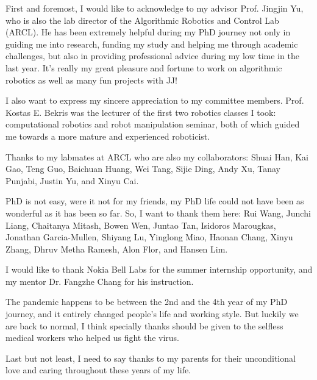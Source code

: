
\begin{acknowledgments}
First and foremost, I would like to acknowledge to my advisor Prof. Jingjin Yu, 
who is also the lab director of the Algorithmic Robotics and Control Lab (ARCL). 
He has been extremely helpful during my PhD journey 
not only in guiding me into research, funding my study and helping me through academic challenges, 
but also in providing professional advice during my low time in the last year. 
It's really my great pleasure and fortune to work on algorithmic robotics 
as well as many fun projects with JJ! 

I also want to express my sincere appreciation to my committee members. 
Prof. Kostas E. Bekris was the lecturer of the first two robotics classes I took: 
computational robotics and robot manipulation seminar, both of which guided me 
towards a more mature and experienced roboticist. 

Thanks to my labmates at ARCL who are also my collaborators: Shuai Han, 
Kai Gao, Teng Guo, Baichuan Huang, Wei Tang, Sijie Ding, Andy Xu, Tanay Punjabi, 
Justin Yu, and Xinyu Cai. 

PhD is not easy, were it not for my friends, my PhD life 
could not have been as wonderful as it has been so far. 
So, I want to thank them here: Rui Wang, Junchi Liang, Chaitanya Mitash, Bowen Wen, Juntao Tan, 
Isidoros Marougkas, Jonathan Garcia-Mullen, Shiyang Lu, Yinglong Miao, Haonan Chang, Xinyu Zhang, 
Dhruv Metha Ramesh, Alon Flor, and Hansen Lim. 

I would like to thank Nokia Bell Labs for the summer internship opportunity,
and my mentor Dr. Fangzhe Chang for his instruction.

The pandemic happens to be between the 2nd and the 4th year of my PhD journey, 
and it entirely changed people's life and working style. 
But luckily we are back to normal, I think specially thanks should be given to the 
selfless medical workers who helped us fight the virus. 

Last but not least, I need to say thanks to my parents for their unconditional love 
and caring throughout these years of my life. 

\end{acknowledgments}
